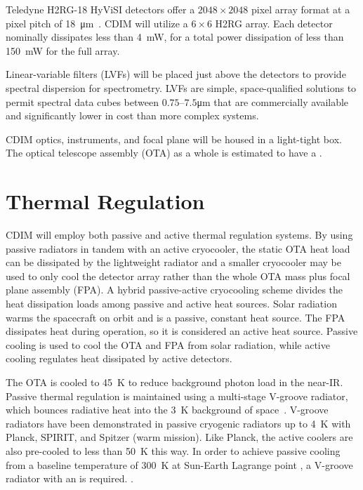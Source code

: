 \documentclass{ws-jai}
\begin{document}
Teledyne H2RG-18 HyViSI detectors offer a $2048\times2048$ pixel array format at a pixel pitch of \SI{18}{\micro\meter}~\cite{teledyneH2RG}.
CDIM will utilize a $6\times6$ H2RG array.
Each detector nominally dissipates less than \SI{4}{\milli\watt}, for a total power dissipation of less than \SI{150}{\milli\watt} for the full array.

Linear-variable filters (LVFs) will be placed just above the detectors to provide spectral dispersion for spectrometry.
LVFs are simple, space-qualified solutions to permit spectral data cubes between $0.75$--$7.5$\si{\micro\meter} that are commercially available and significantly lower in cost than more complex systems. 

CDIM optics, instruments, and focal plane will be housed in a light-tight box.
The optical telescope assembly (OTA) as a whole is estimated to have a .

\section{Thermal Regulation}
\label{sec:thermal}
CDIM will employ both passive and active thermal regulation systems.
By using passive radiators in tandem with an active cryocooler, the static OTA heat load can be dissipated by the lightweight radiator and a smaller cryocooler may be used to only cool the detector array rather than the whole OTA mass plus focal plane assembly (FPA).
A hybrid passive-active cryocooling scheme divides the heat dissipation loads among passive and active heat sources.
Solar radiation warms the spacecraft on orbit and is a passive, constant heat source.
The FPA dissipates heat during operation, so it is considered an active heat source.
Passive cooling is used to cool the OTA and FPA from solar radiation, while active cooling regulates heat dissipated by active detectors.

The OTA is cooled to \SI{45}{\kelvin} to reduce background photon load in the near-IR.\@
Passive thermal regulation is maintained using a multi-stage V-groove radiator, which bounces radiative heat into the \SI{3}{\kelvin} background of space~\cite{bard_1987}.
V-groove radiators have been demonstrated in passive cryogenic radiators up to \SI{4}{\kelvin} with Planck, SPIRIT, and Spitzer (warm mission).\@
Like Planck, the active coolers are also pre-cooled to less than \SI{50}{\kelvin} this way. 
In order to achieve passive cooling from a baseline temperature of \SI{300}{\kelvin} at Sun-Earth Lagrange point \Ltwo, a  V-groove radiator with an  is required.
.
\end{document}
